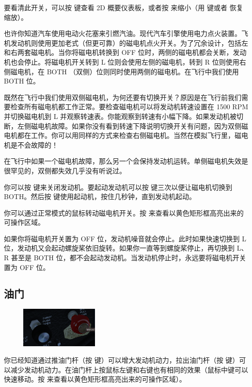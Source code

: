 要看清此开关，可以按  键查看 2D 概要仪表板，或者按  来缩小（用  键或者  恢复缩放）。

也许你知道汽车使用电动火花塞来引燃汽油。现代汽车引擎使用电力点火装置。飞机发动机则使用更加老式（但更可靠）的磁电机点火开关。为了冗余设计，包括左和右两套磁电机。当你将磁电机转换到 OFF 位时，两侧的磁电机都会关断，发动机也会停止。将磁电机开关转到 L 位则会使用左侧的磁电机，转到 R 位则使用右侧磁电机，在 BOTH （双侧）位则同时使用两侧的磁电机。在飞行中我们使用 BOTH 位。

既然在飞行中我们使用双侧磁电机，为何还要有切换开关？原因是在飞行前我们需要检查所有磁电机都工作正常。要检查磁电机可以将发动机转速设置在 1500 RPM 并切换磁电机到 L 并观察转速表。你能观察到转速有小幅下降。如果发动机被切断，左侧磁电机故障。如果你没有看到转速下降说明切换开关有问题，因为双侧磁电机都在工作。你可以用同样的方式来检查右侧磁电机。当然在模拟飞行里，磁电机是不会故障的！

在飞行中如果一个磁电机故障，那么另一个会保持发动机运转。单侧磁电机失效是很罕见的，双侧都失效几乎没有听说过。

你可以按 \key{\{} 键来关闭发动机。要起动发动机可以按 \key{\}} 键三次以便让磁电机切换到 BOTH。然后按  键使用起动机，按住几秒钟，直到发动机起动。

你可以通过正常模式的鼠标转动磁电机开关。按  来查看以黄色矩形框高亮出来的可操作区域。

如果你将磁电机开关置为 OFF 位，发动机噪音就会停止。此时如果快速切换到 L 位，发动机又会起动螺旋桨依旧旋转。如果你一直等到螺旋桨停止，再切换到 L、R 甚至是 BOTH 位，都不会起动发动机。当发动机停止时，永远要将磁电机开关置为 OFF 位。

\subsection*{油门}

\begin{figure}
  \includegraphics[width=0.35\textwidth]{img/basic_tutorial/throt-mix}
\end{figure}

你已经知道通过推油门杆（按  键）可以增大发动机动力，拉出油门杆（按  键）可以减少发动机动力。在油门杆上按鼠标左键和右键也有相同的效果（鼠标中键可以快速移动。按  来查看以黄色矩形框高亮出来的可操作区域）。

